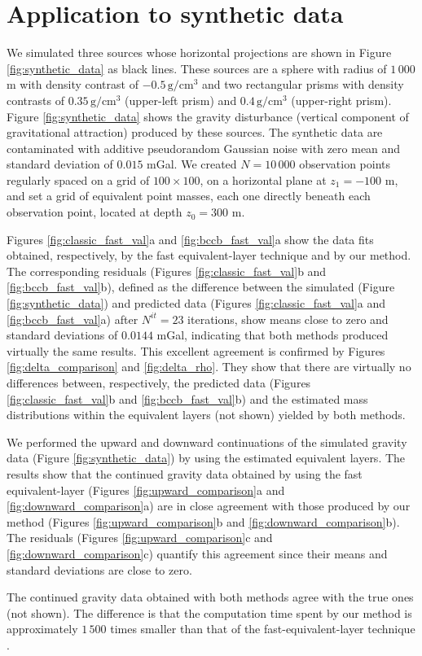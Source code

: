 \section{Application to synthetic data}

We simulated three sources whose horizontal projections are shown in Figure \ref{fig:synthetic_data} as black lines. 
These sources are a sphere with radius of $1\,000$ m with density contrast of 
$-0.5\, \mathrm{g/cm^3}$ and two rectangular prisms with density contrasts of $0.35\, \mathrm{g/cm^3}$ (upper-left prism) 
and $0.4\, \mathrm{g/cm^3}$ (upper-right prism). 
Figure \ref{fig:synthetic_data} shows the gravity disturbance (vertical component of gravitational attraction) 
produced by these sources. The synthetic data are contaminated with additive pseudorandom Gaussian 
noise with zero mean and standard deviation of $0.015$ mGal.
We created $N = 10\,000$ observation points regularly spaced on a grid of $100 \times 100$, on a 
horizontal plane at $z_{1} = -100$ m, and set a grid of equivalent point masses, each one directly beneath each 
observation point, located at depth $z_{0} = 300$ m. 

Figures \ref{fig:classic_fast_val}a and \ref{fig:bccb_fast_val}a show the data fits 
obtained, respectively, by the fast equivalent-layer technique \citep{siqueira-etal2017} 
and by our method. The corresponding residuals (Figures \ref{fig:classic_fast_val}b 
and \ref{fig:bccb_fast_val}b), defined as the difference between the simulated (Figure \ref{fig:synthetic_data}) 
and predicted data (Figures \ref{fig:classic_fast_val}a and \ref{fig:bccb_fast_val}a) after $N^{it} = 23$ iterations, 
show means close to zero and standard deviations of $0.0144$ mGal, indicating that both methods produced virtually 
the same results.
This excellent agreement is confirmed by Figures \ref{fig:delta_comparison} and 
\ref{fig:delta_rho}. They show that there are virtually no differences between, respectively, 
the predicted data (Figures \ref{fig:classic_fast_val}b and \ref{fig:bccb_fast_val}b) and the 
estimated mass distributions within the equivalent layers (not shown) yielded by 
both methods. 

We performed the upward and downward continuations of the simulated gravity data 
(Figure \ref{fig:synthetic_data}) by using the estimated equivalent layers.
The results show that the continued gravity data obtained by using the 
fast equivalent-layer (Figures \ref{fig:upward_comparison}a and \ref{fig:downward_comparison}a) 
are in close agreement with those produced by our method (Figures \ref{fig:upward_comparison}b and 
\ref{fig:downward_comparison}b). The residuals (Figures \ref{fig:upward_comparison}c and \ref{fig:downward_comparison}c)
quantify this agreement since their means and standard deviations are close to zero. 

The continued gravity data obtained with both methods agree with the true ones (not shown).
The difference is that the computation time spent by our method is 
approximately $1\,500$ times smaller than that of the fast-equivalent-layer 
technique \citep{siqueira-etal2017}. 